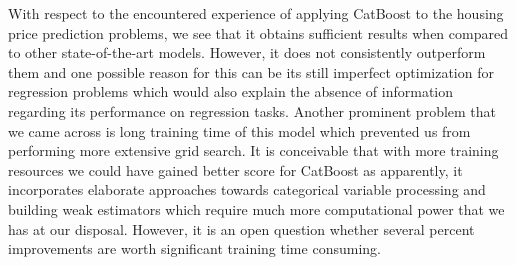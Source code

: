 With respect to the encountered experience of applying CatBoost to the housing price prediction problems, we see that it obtains sufficient results when compared to other state-of-the-art models. However, it does not consistently outperform them and one possible reason for this can be its still imperfect optimization for regression problems which would also explain the absence of information regarding its performance on regression tasks. Another prominent problem that we came across is long training time of this model which prevented us from performing more extensive grid search. It is conceivable that with more training resources we could have gained better score for CatBoost as apparently, it incorporates elaborate approaches towards categorical variable processing and building weak estimators which require much more computational power that we has at our disposal. However, it is an open question whether several percent improvements are worth significant training time consuming.